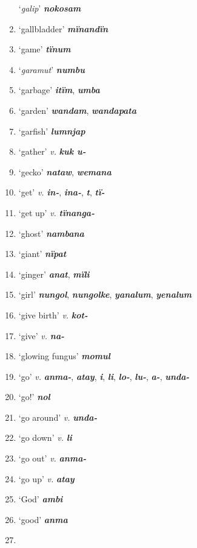 \begin{enumerate}[noitemsep, label={}, align=left, widest=190, labelsep=1ex,leftmargin=*,itemindent=-10pt]
‘\textit{galip}’ \textbf{\textit{nokosam}} \item
‘gallbladder’ \textbf{\textit{mïnandïn}} \item
‘game’ \textbf{\textit{tïnum}} \item
‘\textit{garamut}’ \textbf{\textit{numbu}} \item
‘garbage’ \textbf{\textit{itïm}}, \textbf{\textit{umba}} \item
‘garden’ \textbf{\textit{wandam}}, \textbf{\textit{wandapata}} \item
‘garfish’ \textbf{\textit{lumnjap}} \item
‘gather’ \textit{v.} \textbf{\textit{kuk u-}} \item
‘gecko’ \textbf{\textit{nataw}}, \textbf{\textit{wemana}} \item
‘get’ \textit{v.} \textbf{\textit{in-}}, \textbf{\textit{ina-}}, \textbf{\textit{t}}, \textbf{\textit{tï-}} \item
‘get up’ \textit{v.} \textbf{\textit{tïnanga-}} \item
‘ghost’ \textbf{\textit{nambana}} \item
‘giant’ \textbf{\textit{nïpat}} \item
‘ginger’ \textbf{\textit{anat}}, \textbf{\textit{mïli}} \item
‘girl’ \textbf{\textit{nungol}}, \textbf{\textit{nungolke}}, \textbf{\textit{yanalum}}, \textbf{\textit{yenalum}} \item
‘give birth’ \textit{v.} \textbf{\textit{kot-}} \item
‘give’ \textit{v.} \textbf{\textit{na-}} \item
‘glowing fungus’ \textbf{\textit{momul}} \item
‘go’ \textit{v.} \textbf{\textit{anma-}}, \textbf{\textit{atay}}, \textbf{\textit{i}}, \textbf{\textit{li}}, \textbf{\textit{lo-}}, \textbf{\textit{lu-}}, \textbf{\textit{a-}}, \textbf{\textit{unda-}} \item
‘go!’ \textbf{\textit{nol}} \item
‘go around’ \textit{v.} \textbf{\textit{unda-}} \item
‘go down’ \textit{v.} \textbf{\textit{li}} \item
‘go out’ \textit{v.} \textbf{\textit{anma-}} \item
‘go up’ \textit{v.} \textbf{\textit{atay}} \item
‘God’ \textbf{\textit{ambi}} \item
‘good’ \textbf{\textit{anma}} \item

\end{enumerate}
